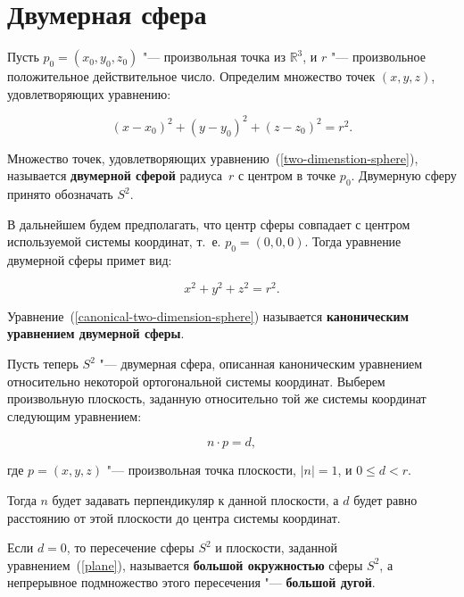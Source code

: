 \section{Двумерная сфера}

Пусть $p_0=(x_0,y_0,z_0)$ "--- произвольная точка из $\mathbb{R}^3$, и $r$ "--- произвольное положительное
действительное число. Определим множество точек $(x,y,z)$, удовлетворяющих уравнению:

\begin{equation}
(x-x_0)^2+(y-y_0)^2+(z-z_0)^2=r^2.
\label{two-dimenstion-sphere}
\end{equation}

\begin{definition}
Множество точек, удовлетворяющих уравнению~(\ref{two-dimenstion-sphere}), называется \textbf{двумерной сферой}
радиуса~$r$ с центром в точке $p_0$. Двумерную сферу принято обозначать $S^2$.
\end{definition}

В дальнейшем будем предполагать, что центр сферы совпадает с центром используемой системы координат, т.~е. $p_0=(0,0,
0)$. Тогда уравнение двумерной сферы примет вид:

\begin{equation}
x^2+y^2+z^2=r^2.
\label{canonical-two-dimension-sphere}
\end{equation}

\begin{definition}
Уравнение~(\ref{canonical-two-dimension-sphere}) называется \textbf{каноническим уравнением двумерной сферы}.
\end{definition}

Пусть теперь $S^2$ "--- двумерная сфера, описанная каноническим уравнением относительно некоторой ортогональной
системы координат. Выберем произвольную плоскость, заданную относительно той же системы координат следующим уравнением:

\begin{equation}
n \cdot p = d,
\label{plane}
\end{equation}

\noindent где $p=(x,y,z)$ "--- произвольная точка плоскости, $|n|=1$, и $0 \le d < r$.

Тогда $n$ будет задавать перпендикуляр к данной плоскости, а $d$ будет равно расстоянию от этой плоскости до центра
системы координат.

\begin{definition}
Если $d=0$, то пересечение сферы $S^2$ и плоскости, заданной уравнением~(\ref{plane}), называется \textbf{большой
окружностью} сферы $S^2$, а непрерывное подмножество этого пересечения "--- \textbf{большой дугой}.
\end{definition}

